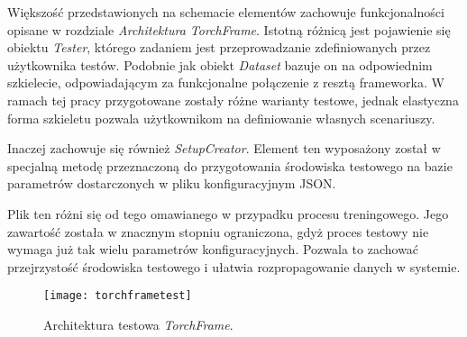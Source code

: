     Większość przedstawionych na schemacie elementów zachowuje funkcjonalności
    opisane w rozdziale \textit{Architektura TorchFrame}. Istotną różnicą jest
    pojawienie się obiektu \textit{Tester}, którego zadaniem jest przeprowadzanie
    zdefiniowanych przez użytkownika testów. Podobnie jak obiekt \textit{Dataset} bazuje
    on na odpowiednim szkielecie, odpowiadającym za funkcjonalne połączenie z
    resztą frameworka. W ramach tej pracy przygotowane zostały różne warianty
    testowe, jednak elastyczna forma szkieletu pozwala użytkownikom
    na definiowanie własnych scenariuszy.

    Inaczej zachowuje się również \textit{SetupCreator}. Element ten wyposażony został w specjalną
    metodę przeznaczoną do przygotowania środowiska testowego na bazie parametrów
    dostarczonych w pliku konfiguracyjnym JSON.

    Plik ten różni się od tego omawianego w przypadku procesu treningowego. Jego
    zawartość została w znacznym stopniu ograniczona, gdyż proces testowy nie
    wymaga już tak wielu parametrów konfiguracyjnych. Pozwala to zachować
    przejrzystość środowiska testowego i ułatwia rozpropagowanie danych
    w systemie.

    \begin{figure}[h!]
      \centering
      \texttt{[image: torchframetest]}
      \caption[Architektura testowa \textit{TorchFrame} - źródło: Rysunek własny]{Architektura testowa \textit{TorchFrame}.}
      \label{fig:torchframetest}
    \end{figure}

